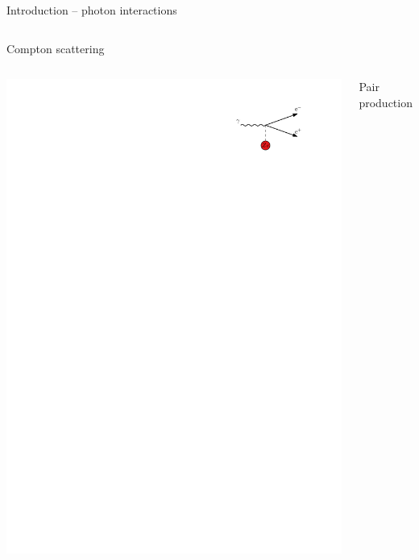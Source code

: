 \documentclass[11pt,xcolor=dvipsnames,professionalfonts]{beamer}
\begin{document}
\begin{frame}{Introduction -- photon interactions}
\begin{columns}
		Compton scattering
	\end{columns}
	\vspace{0.2cm}
	\begin{columns}
		\begin{center}
			\includegraphics{./figures/pair_intro.pdf}
		\end{center}
		
		Pair production
	\end{columns}
\end{frame}
\end{document}
